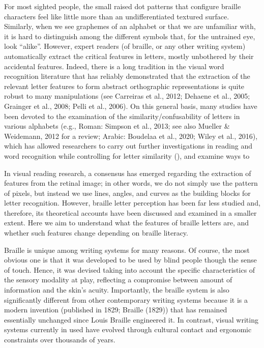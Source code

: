 \documentclass[english,man]{apa7}
\begin{document}
For most sighted people, the small raised dot patterns that configure braille characters feel like little more than an undifferentiated textured surface. Similarly, when we see graphemes of an alphabet or that we are unfamiliar with, it is hard to distinguish among the different symbols that, for the untrained eye, look \enquote{alike}. However, expert readers (of braille, or any other writing system) automatically extract the critical features in letters, mostly unbothered by their accidental features. Indeed, there is a long tradition in the visual word recognition literature that has reliably demonstrated that the extraction of the relevant letter features to form abstract orthographic representations is quite robust to many manipulations (see Carreiras et al., 2012; Dehaene et al., 2005; Grainger et al., 2008; Pelli et al., 2006). On this general basis, many studies have been devoted to the examination of the similarity/confusability of letters in various alphabets (e.g., Roman: Simpson et al., 2013; see also Mueller \& Weidemann, 2012 for a review; Arabic: Boudelaa et al., 2020; Wiley et al., 2016), which has allowed researchers to carry out further investigations in reading and word recognition while controlling for letter similarity ({\colorbox{blue}{\sffamily\scriptsize\bfseries\color{white}{abl}}}{\sffamily\small\itshape\color{blue}{CITE: e.g., XXXX Marcet...}}), and examine ways to {\colorbox{blue}{\sffamily\scriptsize\bfseries\color{white}{abl}}}{\sffamily\small\itshape\color{blue}{Say something about expertise effects -> WILEY. and that together --> move towards a comprehensive understanding of letter identification and reading}}

In visual reading research, a consensus has emerged regarding the extraction of features from the retinal image; in other words, we do not simply use the pattern of pixels, but instead we use lines, angles, and curves as the building blocks for letter recognition. However, braille letter perception has been far less studied and, therefore, its theoretical accounts have been discussed and examined in a smaller extent. Here we aim to understand what the features of braille letters are, and whether such features change depending on braille literacy.

Braille is unique among writing systems for many reasons. Of course, the most obvious one is that it was developed to be used by blind people though the sense of touch. Hence, it was devised taking into account the specific characteristics of the sensory modality at play, reflecting a compromise between amount of information and the skin's acuity. Importantly, the braille system is also significantly different from other contemporary writing systems because it is a modern invention (published in 1829; Braille (1829)) that has remained essentially unchanged since Louis Braille engineered it. In contrast, visual writing systems currently in used have evolved through cultural contact and ergonomic constraints over thousands of years.
\end{document}
